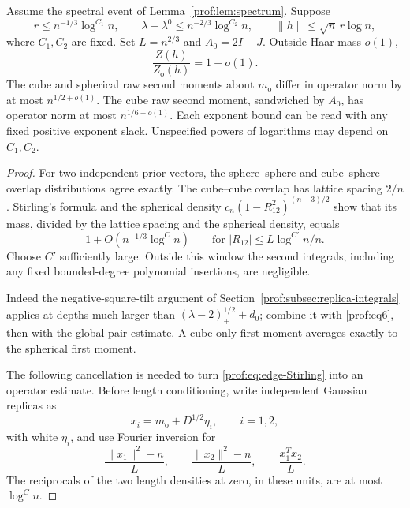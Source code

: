 \begin{proposition}\label{prof:prop:polylog}
Assume the spectral event of Lemma~\ref{prof:lem:spectrum}.  Suppose
\[
 r\le n^{-1/3}\log^{C_1}n,\qquad
 \lambda-\lambda^0\le n^{-2/3}\log^{C_2}n,\qquad
 \|h\|\le\sqrt n\,r\log n,
\]
where $C_1,C_2$ are fixed.  Set $L=n^{2/3}$ and $A_0=2I-J$.
Outside Haar mass $o(1)$,
\[
 \frac{Z(h)}{Z_{\mathrm o}(h)}=1+o(1).
\]
The cube and spherical raw second moments about $m_{\mathrm o}$
differ in operator norm by at most $n^{1/2+o(1)}$.  The cube raw
second moment, sandwiched by $A_0$, has operator norm at most
$n^{1/6+o(1)}$.  Each exponent bound can be read with any fixed
positive exponent slack.  Unspecified powers of logarithms may
depend on $C_1,C_2$.
\end{proposition}

\begin{proof}
For two independent prior vectors, the sphere--sphere and
cube--sphere overlap distributions agree exactly.  The cube--cube
overlap has lattice spacing $2/n$.  Stirling's formula and the
spherical density $c_n(1-R_{12}^2)^{(n-3)/2}$ show that its mass,
divided by the lattice spacing and the spherical density, equals
\begin{equation}\label{prof:eq:edge-Stirling}
 1+O(n^{-1/3}\log^C n)
 \qquad\text{for }|R_{12}|\le L\log^{C'}n/n.
\end{equation}
Choose $C'$ sufficiently large.  Outside this window the second
integrals, including any fixed bounded-degree polynomial insertions,
are negligible.

Indeed the negative-square-tilt argument of
Section~\ref{prof:subsec:replica-integrals} applies at depths much
larger than $(\lambda-2)_+^{1/2}+d_0$; combine it with
\eqref{prof:eq6}, then with the global pair estimate.  A cube-only
first moment averages exactly to the spherical first moment.

The following cancellation is needed to turn
\eqref{prof:eq:edge-Stirling} into an operator estimate.  Before
length conditioning, write independent Gaussian replicas as
\[
 x_i=m_{\mathrm o}+D^{1/2}\eta_i,\qquad i=1,2,
\]
with white $\eta_i$, and use Fourier inversion for
\begin{equation}\label{prof:eq:edge-statistics}
 \frac{\|x_1\|^2-n}{L},\qquad
 \frac{\|x_2\|^2-n}{L},\qquad
 \frac{x_1^Tx_2}{L}.
\end{equation}
The reciprocals of the two length densities at zero, in these
units, are at most $\log^C n$.


\end{proof}
